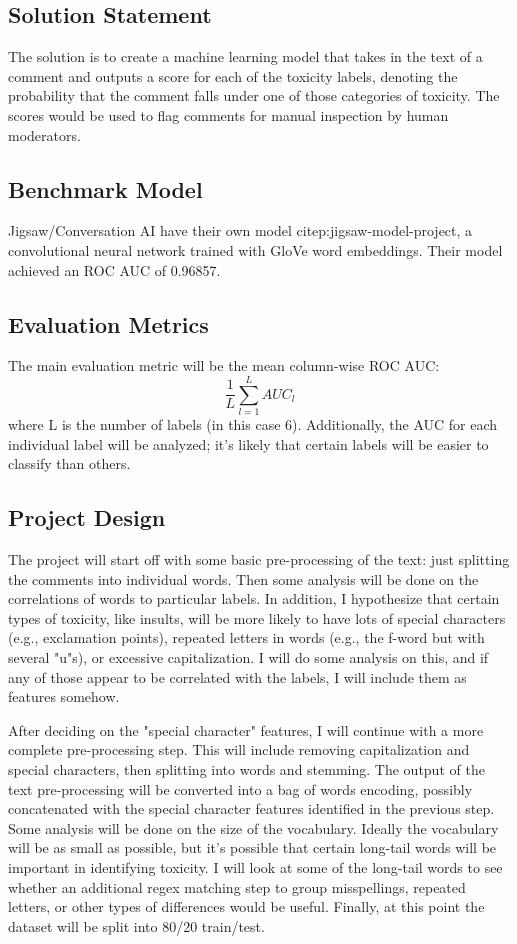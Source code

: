 \documentclass[12pt]{article}
\begin{document}
\subsection*{Solution Statement}
\label{sec:org9dda7cd}
The solution is to create a machine learning model that takes in the text of a comment and outputs a score for each of the toxicity labels, denoting the probability that the comment falls under one of those categories of toxicity. The scores would be used to flag comments for manual inspection by human moderators.
\subsection*{Benchmark Model}
\label{sec:orgb9a67cb}
Jigsaw/Conversation AI have their own model citep:jigsaw-model-project, a convolutional neural network trained with GloVe word embeddings. Their model achieved an ROC AUC of 0.96857.
\subsection*{Evaluation Metrics}
\label{sec:org2c5750c}
The main evaluation metric will be the mean column-wise ROC AUC:
\begin{equation}
\frac{1}{L} \sum_{l=1}^{L} AUC_{l}
\end{equation}
where L is the number of labels (in this case 6). Additionally, the AUC for each individual label will be analyzed; it's likely that certain labels will be easier to classify than others.
\subsection*{Project Design}
\label{sec:org70f60c2}
The project will start off with some basic pre-processing of the text: just splitting the comments into individual words. Then some analysis will be done on the correlations of words to particular labels. In addition, I hypothesize that certain types of toxicity, like insults, will be more likely to have lots of special characters (e.g., exclamation points), repeated letters in words (e.g., the f-word but with several "u"s), or excessive capitalization. I will do some analysis on this, and if any of those appear to be correlated with the labels, I will include them as features somehow.

After deciding on the "special character" features, I will continue with a more complete pre-processing step. This will include removing capitalization and special characters, then splitting into words and stemming. The output of the text pre-processing will be converted into a bag of words encoding, possibly concatenated with the special character features identified in the previous step. Some analysis will be done on the size of the vocabulary. Ideally the vocabulary will be as small as possible, but it's possible that certain long-tail words will be important in identifying toxicity. I will look at some of the long-tail words to see whether an additional regex matching step to group misspellings, repeated letters, or other types of differences would be useful. Finally, at this point the dataset will be split into 80/20 train/test.
\end{document}
